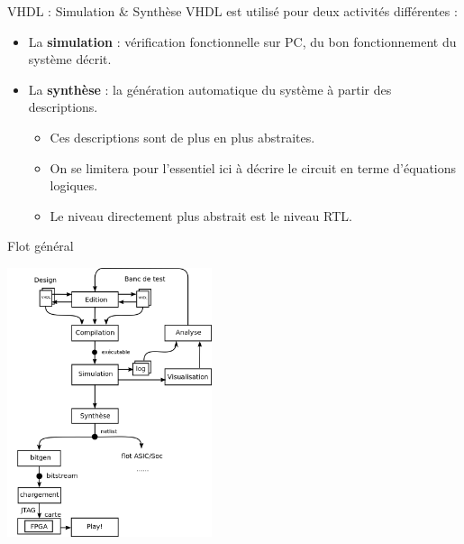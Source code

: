 \documentclass[xcolor=table]{beamer} %
\begin{document}
\begin{frame}{VHDL : Simulation \& Synthèse}
  VHDL est utilisé pour deux activités différentes :

  \begin{itemize}
    \item La \textbf{simulation} : vérification fonctionnelle sur PC, du bon fonctionnement du système décrit.
    \item La \textbf{synthèse} : la génération automatique du système à partir des descriptions.
    \begin{itemize}
      \item Ces descriptions sont de plus en plus abstraites.
      \item On se limitera pour l'essentiel ici à décrire le circuit en terme d'équations logiques.
      \item Le niveau directement plus abstrait est le niveau RTL.
    \end{itemize}
  \end{itemize}
\end{frame}

\begin{frame}{Flot général}
  \begin{center}
  \begin{minipage}[t]{8cm}
   \centering
   \includegraphics[width=6cm]{./figures/conception_generale.png}
  \end{minipage}
  \end{center}
\end{frame}
\end{document}
